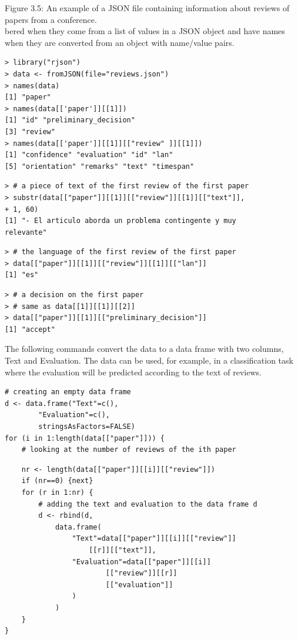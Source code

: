 \documentclass[10pt]{book}
\begin{document}
Figure 3.5: An example of a JSON file containing information about reviews of papers from a conference.\\
bered when they come from a list of values in a JSON object and have names when they are converted from an object with name/value pairs.

\begin{verbatim}
> library("rjson")
> data <- fromJSON(file="reviews.json")
> names(data)
[1] "paper"
> names(data[['paper']][[1]])
[1] "id" "preliminary_decision"
[3] "review"
> names(data[['paper']][[1]][["review" ]][[1]])
[1] "confidence" "evaluation" "id" "lan"
[5] "orientation" "remarks" "text" "timespan"
\end{verbatim}

\begin{verbatim}
> # a piece of text of the first review of the first paper
> substr(data[["paper"]][[1]][["review"]][[1]][["text"]],
+ 1, 60)
[1] "- El articulo aborda un problema contingente y muy
relevante"
\end{verbatim}

\begin{verbatim}
> # the language of the first review of the first paper
> data[["paper"]][[1]][["review"]][[1]][["lan"]]
[1] "es"
\end{verbatim}

\begin{verbatim}
> # a decision on the first paper
> # same as data[[1]][[1]][[2]]
> data[["paper"]][[1]][["preliminary_decision"]]
[1] "accept"
\end{verbatim}

The following commands convert the data to a data frame with two columns, Text and Evaluation. The data can be used, for example, in a classification task where the evaluation will be predicted according to the text of reviews.

\begin{verbatim}
# creating an empty data frame
d <- data.frame("Text"=c(),
        "Evaluation"=c(),
        stringsAsFactors=FALSE)
for (i in 1:length(data[["paper"]])) {
    # looking at the number of reviews of the ith paper
\end{verbatim}

\begin{verbatim}
    nr <- length(data[["paper"]][[i]][["review"]])
    if (nr==0) {next}
    for (r in 1:nr) {
        # adding the text and evaluation to the data frame d
        d <- rbind(d,
            data.frame(
                "Text"=data[["paper"]][[i]][["review"]]
                    [[r]][["text"]],
                "Evaluation"=data[["paper"]][[i]]
                        [["review"]][[r]]
                        [["evaluation"]]
                )
            )
    }
}
\end{verbatim}
\end{document}
